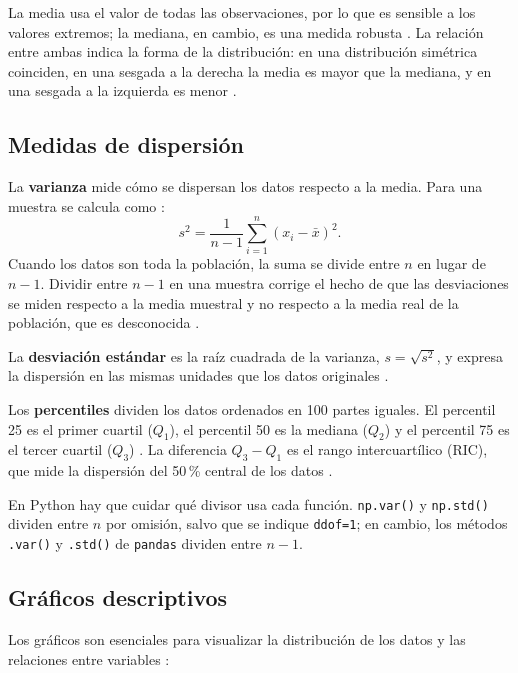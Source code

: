 \documentclass[11pt,letterpaper]{article}
\begin{document}
La media usa el valor de todas las observaciones, por lo que es sensible a los valores extremos; la mediana, en cambio, es una medida robusta \parencite{bruce2020}. La relación entre ambas indica la forma de la distribución: en una distribución simétrica coinciden, en una sesgada a la derecha la media es mayor que la mediana, y en una sesgada a la izquierda es menor \parencite{tecnm2026_documento_fuente}.

\subsection{Medidas de dispersión}

La \textbf{varianza} mide cómo se dispersan los datos respecto a la media. Para una muestra se calcula como \parencite{tecnm2026_documento_fuente}:
\begin{equation}
    s^2 = \frac{1}{n - 1} \sum_{i=1}^{n} (x_i - \bar{x})^2.
    \label{eq:varianza}
\end{equation}
Cuando los datos son toda la población, la suma se divide entre $n$ en lugar de $n - 1$. Dividir entre $n - 1$ en una muestra corrige el hecho de que las desviaciones se miden respecto a la media muestral y no respecto a la media real de la población, que es desconocida \parencite{bruce2020}.

La \textbf{desviación estándar} es la raíz cuadrada de la varianza, $s = \sqrt{s^2}$, y expresa la dispersión en las mismas unidades que los datos originales \parencite{tecnm2026_documento_fuente}.

Los \textbf{percentiles} dividen los datos ordenados en 100 partes iguales. El percentil 25 es el primer cuartil ($Q_1$), el percentil 50 es la mediana ($Q_2$) y el percentil 75 es el tercer cuartil ($Q_3$) \parencite{tecnm2026_documento_fuente}. La diferencia $Q_3 - Q_1$ es el rango intercuartílico (RIC), que mide la dispersión del 50\,\% central de los datos \parencite{bruce2020}.

En Python hay que cuidar qué divisor usa cada función. \texttt{np.var()} y \texttt{np.std()} dividen entre $n$ por omisión, salvo que se indique \texttt{ddof=1}; en cambio, los métodos \texttt{.var()} y \texttt{.std()} de \texttt{pandas} dividen entre $n - 1$.

\subsection{Gráficos descriptivos}

Los gráficos son esenciales para visualizar la distribución de los datos y las relaciones entre variables \parencite{tecnm2026_documento_fuente,bruce2020}:
\end{document}
